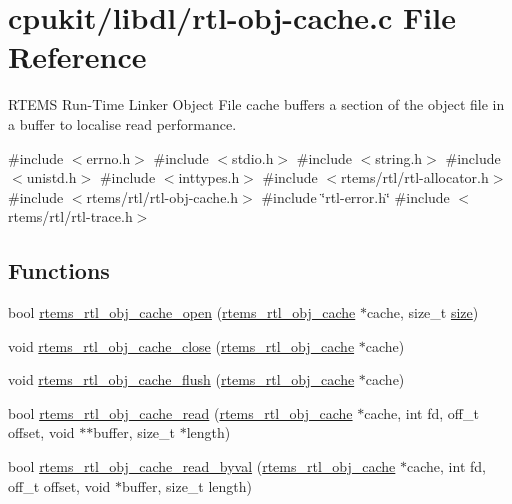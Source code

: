 \hypertarget{rtl-obj-cache_8c}{}\section{cpukit/libdl/rtl-\/obj-\/cache.c File Reference}
\label{rtl-obj-cache_8c}


R\+T\+E\+MS Run-\/\+Time Linker Object File cache buffers a section of the object file in a buffer to localise read performance.  


{\ttfamily \#include $<$errno.\+h$>$}\newline
{\ttfamily \#include $<$stdio.\+h$>$}\newline
{\ttfamily \#include $<$string.\+h$>$}\newline
{\ttfamily \#include $<$unistd.\+h$>$}\newline
{\ttfamily \#include $<$inttypes.\+h$>$}\newline
{\ttfamily \#include $<$rtems/rtl/rtl-\/allocator.\+h$>$}\newline
{\ttfamily \#include $<$rtems/rtl/rtl-\/obj-\/cache.\+h$>$}\newline
{\ttfamily \#include \char`\"{}rtl-\/error.\+h\char`\"{}}\newline
{\ttfamily \#include $<$rtems/rtl/rtl-\/trace.\+h$>$}\newline
\subsection*{Functions}
\begin{DoxyCompactItemize}
\item 
bool \mbox{\hyperlink{rtl-obj-cache_8c_a5b2951671bf88bf7b8e915dd8938b691}{rtems\+\_\+rtl\+\_\+obj\+\_\+cache\+\_\+open}} (\mbox{\hyperlink{structrtems__rtl__obj__cache}{rtems\+\_\+rtl\+\_\+obj\+\_\+cache}} $\ast$cache, size\+\_\+t \mbox{\hyperlink{sun4u_2tte_8h_a245260f6f74972558f61b85227df5aae}{size}})
\item 
void \mbox{\hyperlink{rtl-obj-cache_8c_af823408cc02aeceb7ab687c7d818ad1a}{rtems\+\_\+rtl\+\_\+obj\+\_\+cache\+\_\+close}} (\mbox{\hyperlink{structrtems__rtl__obj__cache}{rtems\+\_\+rtl\+\_\+obj\+\_\+cache}} $\ast$cache)
\item 
void \mbox{\hyperlink{rtl-obj-cache_8c_a111b8cc86622e49926e5267d2be870e7}{rtems\+\_\+rtl\+\_\+obj\+\_\+cache\+\_\+flush}} (\mbox{\hyperlink{structrtems__rtl__obj__cache}{rtems\+\_\+rtl\+\_\+obj\+\_\+cache}} $\ast$cache)
\item 
bool \mbox{\hyperlink{rtl-obj-cache_8c_adad604773572de631e48629ce4a7e212}{rtems\+\_\+rtl\+\_\+obj\+\_\+cache\+\_\+read}} (\mbox{\hyperlink{structrtems__rtl__obj__cache}{rtems\+\_\+rtl\+\_\+obj\+\_\+cache}} $\ast$cache, int fd, off\+\_\+t offset, void $\ast$$\ast$buffer, size\+\_\+t $\ast$length)
\item 
bool \mbox{\hyperlink{rtl-obj-cache_8c_a80432d8deca613a70eb9fa3c8ae017c1}{rtems\+\_\+rtl\+\_\+obj\+\_\+cache\+\_\+read\+\_\+byval}} (\mbox{\hyperlink{structrtems__rtl__obj__cache}{rtems\+\_\+rtl\+\_\+obj\+\_\+cache}} $\ast$cache, int fd, off\+\_\+t offset, void $\ast$buffer, size\+\_\+t length)
\end{DoxyCompactItemize}


